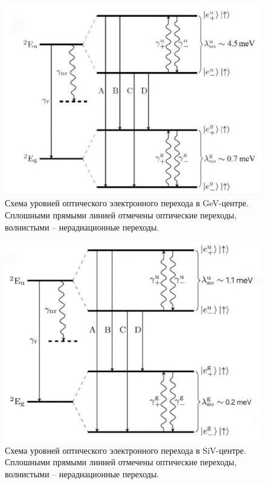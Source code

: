 \begin{figure}[!h]
    \begin{center}
        \includegraphics[width=0.7 \linewidth]{Energy levels GeV.jpg}
        \caption{Схема уровней оптического электронного перехода в GeV-центре.
        Сплошными прямыми линией отмечены оптические переходы,
        волнистыми -- нерадиационные переходы.}
        \label{Energy levels GeV}
    \end{center}
\end{figure}

\begin{figure}[!h]
    \begin{center}
        \includegraphics[width=0.7 \linewidth]{Energy levels SiV.jpg}
        \caption{Схема уровней оптического электронного перехода в SiV-центре.
        Сплошными прямыми линией отмечены оптические переходы,
        волнистыми -- нерадиационные переходы.}
        \label{Energy levels SiV}
    \end{center}
\end{figure}

